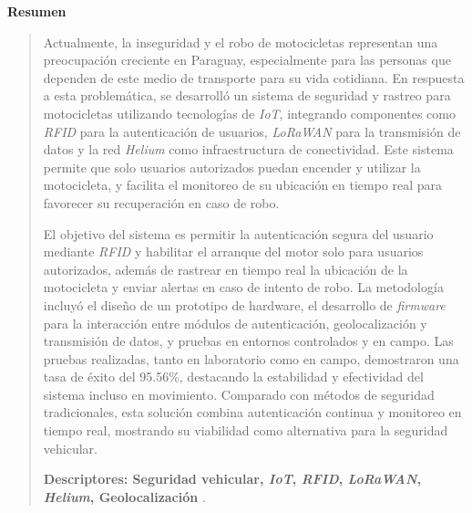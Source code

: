\cleardoublepage
\thispagestyle{empty}
\begin{center}
\begin{LARGE}
\textbf{Resumen}
\end{LARGE}
\end{center}
\begin{quotation}


Actualmente, la inseguridad y el robo de motocicletas representan una preocupación creciente en Paraguay, especialmente para las personas que dependen de este medio de transporte para su vida cotidiana. En respuesta a esta problemática, se desarrolló un sistema de seguridad y rastreo para motocicletas utilizando tecnologías de \textit{IoT}, integrando componentes como \textit{RFID} para la autenticación de usuarios, \textit{LoRaWAN} para la transmisión de datos y la red \textit{Helium} como infraestructura de conectividad. Este sistema permite que solo usuarios autorizados puedan encender y utilizar la motocicleta, y facilita el monitoreo de su ubicación en tiempo real para favorecer su recuperación en caso de robo.

El objetivo del sistema es permitir la autenticación segura del usuario mediante \textit{RFID} y habilitar el arranque del motor solo para usuarios autorizados, además de rastrear en tiempo real la ubicación de la motocicleta y enviar alertas en caso de intento de robo. La metodología incluyó el diseño de un prototipo de hardware, el desarrollo de \textit{firmware} para la interacción entre módulos de autenticación, geolocalización y transmisión de datos, y pruebas en entornos controlados y en campo.  Las pruebas realizadas, tanto en laboratorio como en campo, demostraron una tasa de éxito del 95.56\%, destacando la estabilidad y efectividad del sistema incluso en movimiento. Comparado con métodos de seguridad tradicionales, esta solución combina autenticación continua y monitoreo en tiempo real, mostrando su viabilidad como alternativa para la seguridad vehicular.


\vspace*{0.5cm}

\noindent \textbf{Descriptores: Seguridad vehicular, \textit{IoT}, \textit{RFID}, \textit{LoRaWAN}, \textit{Helium}, Geolocalización} .
\end{quotation}
